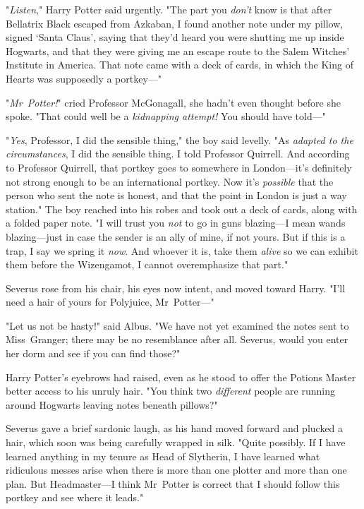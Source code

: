"\emph{Listen}," Harry Potter said urgently. "The part you \emph{don't} know is
that after Bellatrix Black escaped from Azkaban, I found another note under my
pillow, signed `Santa Claus', saying that they'd heard you were shutting me up
inside Hogwarts, and that they were giving me an escape route to the Salem
Witches' Institute in America. That note came with a deck of cards, in which
the King of Hearts was supposedly a portkey—"

"\emph{Mr~Potter!}" cried Professor McGonagall, she hadn't even thought before
she spoke. "That could well be a \emph{kidnapping attempt!} You should have
told—"

"\emph{Yes}, Professor, I did the sensible thing," the boy said levelly. "As
\emph{adapted to the circumstances}, I did the sensible thing. I told Professor
Quirrell. And according to Professor Quirrell, that portkey goes to somewhere
in London—it's definitely not strong enough to be an international portkey.
Now it's \emph{possible} that the person who sent the note is honest, and that
the point in London is just a way station." The boy reached into his robes and
took out a deck of cards, along with a folded paper note. "I will trust you
\emph{not} to go in guns blazing—I mean wands blazing—just in case the
sender is an ally of mine, if not yours. But if this is a trap, I say we spring
it \emph{now}. And whoever it is, take them \emph{alive} so we can exhibit them
before the Wizengamot, I cannot overemphasize that part."

Severus rose from his chair, his eyes now intent, and moved toward Harry. "I'll
need a hair of yours for Polyjuice, Mr~Potter—"

"Let us not be hasty!" said Albus. "We have not yet examined the notes sent to
Miss~Granger; there may be no resemblance after all. Severus, would you enter
her dorm and see if you can find those?"

Harry Potter's eyebrows had raised, even as he stood to offer the Potions
Master better access to his unruly hair. "You think two \emph{different}
people are running around Hogwarts leaving notes beneath pillows?"

Severus gave a brief sardonic laugh, as his hand moved forward and plucked a
hair, which soon was being carefully wrapped in silk. "Quite possibly. If I
have learned anything in my tenure as Head of Slytherin, I have learned what
ridiculous messes arise when there is more than one plotter and more than one
plan. But Headmaster—I think Mr~Potter is correct that I should follow this
portkey and see where it leads."

